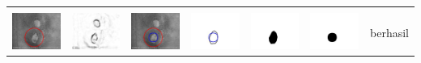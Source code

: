 \begin{table}[H]
\begin{tabular}{|m{0.7in}|m{0.7in}|m{0.7in}|m{0.7in}|m{0.7in}|m{0.7in}|m{0.7in}|}
		&  &  & & & &  \\
		\includegraphics[width=0.7in]{dataset/dataset_3/luka_kuning/ready/25_integer_init.jpg}&
		\includegraphics[width=0.7in]{dataset/dataset_3/luka_kuning/ready/25_integer_ext.jpg}&
		\includegraphics[width=0.7in]{dataset/dataset_3/luka_kuning/ready/25_integer_result.jpg}&
		\includegraphics[width=0.7in]{dataset/dataset_3/luka_kuning/ready/25_gt_r_integer.jpg}&
		\includegraphics[width=0.7in]{dataset/dataset_3/luka_kuning/ready/25_r.jpg}&
		\includegraphics[width=0.7in]{dataset/dataset_3/luka_kuning/ready/25_integer_r.jpg}&
		berhasil\\
		\hline
		

\end{tabular}
\end{table}
